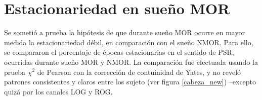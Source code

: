 \section{Estacionariedad en sueño MOR}

Se sometió a prueba la hipótesis de que durante sueño MOR ocurre en mayor medida la estacionariedad
débil, en comparación con el sueño NMOR. Para ello, se compararon el porcentaje de épocas 
estacionarias en el sentido de PSR, ocurridas durante sueño MOR y NMOR. La comparación fue efectuada
usando la prueba $\chi^{2}$ de Pearson con la corrección de contuinidad de Yates, y no reveló
patrones consistentes y claros entre los sujeto (ver figura \ref{cabeza_new}) --excepto quizá
por los canales LOG y ROG.

%
%

